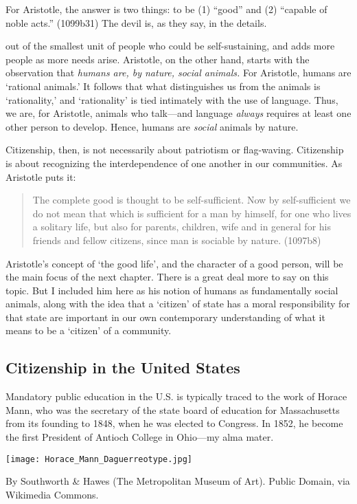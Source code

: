 For Aristotle, the answer is two things: to be (1) ``good'' and (2) ``capable of noble acts.'' (1099b31) The devil is, as they say, in the details.

 out of the smallest unit of people who could be self-sustaining, and adds more people as more needs arise. Aristotle, on the other hand, starts with the observation that \emph{humans are, by nature, social animals.} For Aristotle, humans are `rational animals.' It follows that what distinguishes us from the animals is `rationality,' and `rationality' is tied intimately with the use of language. Thus, we are, for Aristotle, animals who talk---and language \emph{always} requires at least one other person to develop. Hence, humans are \emph{social} animals by nature.

Citizenship, then, is not necessarily about patriotism or flag-waving. Citizenship is about recognizing the interdependence of one another in our communities. As Aristotle puts it:

\begin{quote}

The complete good is thought to be self-sufficient. Now by self-sufficient we do not mean that which is sufficient for a man by himself, for one who lives a solitary life, but also for parents, children, wife and in general for his friends and fellow citizens, since man is sociable by nature. (1097b8) 
\end{quote}

Aristotle's concept of `the good life', and the character of a good person, will be the main focus of the next chapter. There is a great deal more to say on this topic. But I included him here as his notion of humans as fundamentally social animals, along with the idea that a `citizen' of state has a moral responsibility for that state are important in our own contemporary understanding of what it means to be a `citizen' of a community.

\subsection{Citizenship in the United States}
\label{citizenshipintheunitedstates}

Mandatory public education in the U.S. is typically traced to the work of Horace Mann, who was the secretary of the state board of education for Massachusetts from its founding to 1848, when he was elected to Congress. In 1852, he become the first President of Antioch College in Ohio---my alma mater.\begin{marginfigure}\texttt{[image: Horace\_Mann\_Daguerreotype.jpg]}\caption{By Southworth \& Hawes (The Metropolitan Museum of Art). Public Domain, via Wikimedia Commons.}\label{fig:wayland}\end{marginfigure}

